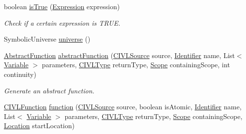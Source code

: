 \begin{DoxyCompactItemize}
\item 
boolean \hyperlink{classedu_1_1udel_1_1cis_1_1vsl_1_1civl_1_1model_1_1common_1_1CommonModelFactory_aabc016e99ce227db3bcb3f0a9da7c411}{is\+True} (\hyperlink{interfaceedu_1_1udel_1_1cis_1_1vsl_1_1civl_1_1model_1_1IF_1_1expression_1_1Expression}{Expression} expression)
\begin{DoxyCompactList}\small\item\em Check if a certain expression is T\+R\+U\+E. \end{DoxyCompactList}\item 
Symbolic\+Universe \hyperlink{classedu_1_1udel_1_1cis_1_1vsl_1_1civl_1_1model_1_1common_1_1CommonModelFactory_acfdd6d7e874745bf556a4ac4ad385976}{universe} ()
\item 
\hyperlink{interfaceedu_1_1udel_1_1cis_1_1vsl_1_1civl_1_1model_1_1IF_1_1AbstractFunction}{Abstract\+Function} \hyperlink{classedu_1_1udel_1_1cis_1_1vsl_1_1civl_1_1model_1_1common_1_1CommonModelFactory_a79704ed815b715dd81ab82d2d24b16e1}{abstract\+Function} (\hyperlink{interfaceedu_1_1udel_1_1cis_1_1vsl_1_1civl_1_1model_1_1IF_1_1CIVLSource}{C\+I\+V\+L\+Source} source, \hyperlink{interfaceedu_1_1udel_1_1cis_1_1vsl_1_1civl_1_1model_1_1IF_1_1Identifier}{Identifier} name, List$<$ \hyperlink{interfaceedu_1_1udel_1_1cis_1_1vsl_1_1civl_1_1model_1_1IF_1_1variable_1_1Variable}{Variable} $>$ parameters, \hyperlink{interfaceedu_1_1udel_1_1cis_1_1vsl_1_1civl_1_1model_1_1IF_1_1type_1_1CIVLType}{C\+I\+V\+L\+Type} return\+Type, \hyperlink{interfaceedu_1_1udel_1_1cis_1_1vsl_1_1civl_1_1model_1_1IF_1_1Scope}{Scope} containing\+Scope, int continuity)
\begin{DoxyCompactList}\small\item\em Generate an abstract function. \end{DoxyCompactList}\item 
\hyperlink{interfaceedu_1_1udel_1_1cis_1_1vsl_1_1civl_1_1model_1_1IF_1_1CIVLFunction}{C\+I\+V\+L\+Function} \hyperlink{classedu_1_1udel_1_1cis_1_1vsl_1_1civl_1_1model_1_1common_1_1CommonModelFactory_a8a7968569d8f0b05aa7ed59dfa5368c7}{function} (\hyperlink{interfaceedu_1_1udel_1_1cis_1_1vsl_1_1civl_1_1model_1_1IF_1_1CIVLSource}{C\+I\+V\+L\+Source} source, boolean is\+Atomic, \hyperlink{interfaceedu_1_1udel_1_1cis_1_1vsl_1_1civl_1_1model_1_1IF_1_1Identifier}{Identifier} name, List$<$ \hyperlink{interfaceedu_1_1udel_1_1cis_1_1vsl_1_1civl_1_1model_1_1IF_1_1variable_1_1Variable}{Variable} $>$ parameters, \hyperlink{interfaceedu_1_1udel_1_1cis_1_1vsl_1_1civl_1_1model_1_1IF_1_1type_1_1CIVLType}{C\+I\+V\+L\+Type} return\+Type, \hyperlink{interfaceedu_1_1udel_1_1cis_1_1vsl_1_1civl_1_1model_1_1IF_1_1Scope}{Scope} containing\+Scope, \hyperlink{interfaceedu_1_1udel_1_1cis_1_1vsl_1_1civl_1_1model_1_1IF_1_1location_1_1Location}{Location} start\+Location)

\end{DoxyCompactItemize}

